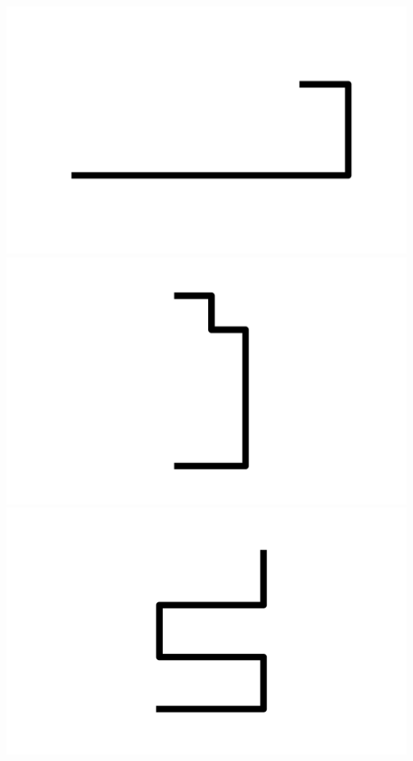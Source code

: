 \documentclass[]{report}
\begin{document}
\includegraphics[scale=.1]{pictures/21/state_cluster_shapes_217.pdf} 
\includegraphics[scale=.1]{pictures/21/state_cluster_shapes_218.pdf} 
\includegraphics[scale=.1]{pictures/21/state_cluster_shapes_219.pdf} 
\end{document}
